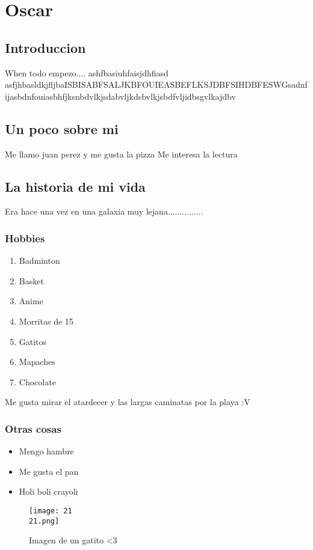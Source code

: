 \chapter{Oscar}

\section{Introduccion}
When todo empezo.... 
ashfbasiuhfaisjdhfiasd
asfjhbasldkjfljbaISBISABFSALJKBFOUIEASBEFLKSJDBFSIHDBFESWGsadnfijasbdnfouiasbhfjksnbdvlkjsdabvljkdsbvlkjsbdfvljidbsgvlkajdbv

\section{Un poco sobre mi}
Me llamo juan perez y me gusta la pizza
Me interesa la lectura ~\cite{guerra,hombre,ensayo,orwel,huxley}

\section{La historia de mi vida}
Era hace una vez en una galaxia muy lejana............... 

\subsection{Hobbies}
\begin{enumerate}
\item Badminton
\item Basket
\item Anime
\item Morritas de 15
\item Gatitos
\item Mapaches
\item Chocolate
\end{enumerate}
Me gusta mirar el atardecer y las largas caminatas por la playa :V

\subsection{Otras cosas}
\begin{itemize}
\item Mengo hambre
\item Me gusta el pan
\item Holi boli crayoli
\end{itemize}

\begin{figure}
  \texttt{[image: 21\\21.png]}
  \caption{Imagen de un gatito <3 }
  \label{fig:Gatito}
\end{figure}

